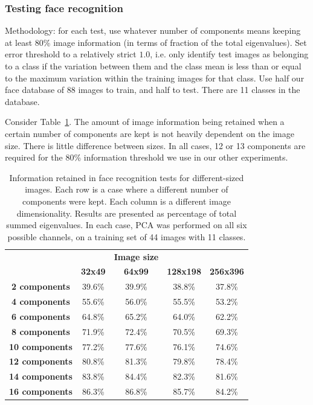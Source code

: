\subsubsection{Testing face recognition}
\label{sec:pcaresults}

Methodology: for each test, use whatever number of components means keeping at least 80\% image information (in terms of fraction of the total eigenvalues). Set error threshold to a relatively strict $1.0$, i.e. only identify test images as belonging to a class if the variation between them and the class mean is less than or equal to the maximum variation within the training images for that class. Use half our face database of 88 images to train, and half to test. There are 11 classes in the database.

Consider Table~\ref{tbl:face-rec-1}. The amount of image information being retained when a certain number of components are kept is not heavily dependent on the image size. There is little difference between sizes. In all cases, 12 or 13 components are required for the 80\% information threshold we use in our other experiments.

\begin{table}[h!]
  \centering
  \begin{tabular}{c c c c c}
    \toprule
    \textbf{ } & \textbf{} & \textbf{Image size} & \textbf{} & \textbf{}\\
    \textbf{ } & \textbf{ 32x49 } & \textbf{ 64x99 } & \textbf{128x198} & \textbf{256x396}\\
    \midrule
    \textbf{2 components} & 39.6\% & 39.9\% & 38.8\% & 37.8\% \\
    \textbf{4 components} & 55.6\% & 56.0\% & 55.5\% & 53.2\% \\
    \textbf{6 components} & 64.8\% & 65.2\% & 64.0\% & 62.2\% \\
    \textbf{8 components} & 71.9\% & 72.4\% & 70.5\% & 69.3\% \\
    \textbf{10 components} & 77.2\% & 77.6\% & 76.1\% & 74.6\% \\
    \textbf{12 components} & 80.8\% & 81.3\% & 79.8\% & 78.4\% \\
    \textbf{14 components} & 83.8\% & 84.4\% & 82.3\% & 81.6\% \\
    \textbf{16 components} & 86.3\% & 86.8\% & 85.7\% & 84.2\% \\
    \bottomrule
  \end{tabular}
  \caption[Information retained in face recognition tests for different-sized images]{Information retained in face recognition tests for different-sized images. Each row is a case where a different number of components were kept. Each column is a different image dimensionality. Results are presented as percentage of total summed eigenvalues. In each case, PCA was performed on all six possible channels, on a training set of 44 images with 11 classes.}
  \label{tbl:face-rec-1}
\end{table}

